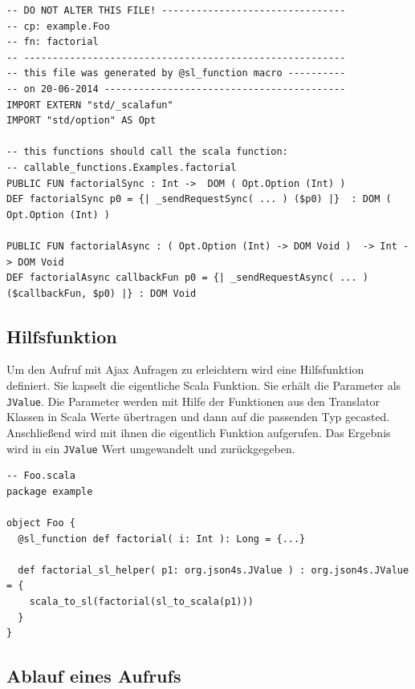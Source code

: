 \documentclass[12pt]{scrreprt}
\begin{document}
\begin{lstlisting}[caption=SL-Modul factorial.sl zur Funktion aus Listing \ref{lst:example-function}, label=lst:example-sl-modul, float=h]
-- DO NOT ALTER THIS FILE! --------------------------------
-- cp: example.Foo
-- fn: factorial
-- --------------------------------------------------------
-- this file was generated by @sl_function macro ----------
-- on 20-06-2014 ------------------------------------------
IMPORT EXTERN "std/_scalafun"
IMPORT "std/option" AS Opt

-- this functions should call the scala function:
-- callable_functions.Examples.factorial
PUBLIC FUN factorialSync : Int ->  DOM ( Opt.Option (Int) )
DEF factorialSync p0 = {| _sendRequestSync( ... ) ($p0) |}  : DOM ( Opt.Option (Int) )

PUBLIC FUN factorialAsync : ( Opt.Option (Int) -> DOM Void )  -> Int -> DOM Void
DEF factorialAsync callbackFun p0 = {| _sendRequestAsync( ... )  ($callbackFun, $p0) |} : DOM Void
\end{lstlisting}

\subsection{Hilfsfunktion}
\label{subsec:helperfunction}

Um den Aufruf mit Ajax Anfragen zu erleichtern wird eine Hilfsfunktion definiert. Sie kapselt die eigentliche Scala Funktion. Sie erhält die Parameter als \lstinline!JValue!. Die Parameter werden mit Hilfe der Funktionen aus den Translator Klassen in Scala Werte übertragen und dann auf die passenden Typ gecasted. Anschließend wird mit ihnen die eigentlich Funktion aufgerufen. Das Ergebnis wird in ein \lstinline!JValue! Wert umgewandelt und zurückgegeben.

\begin{lstlisting}[caption=Hilfsfunktion zur Funktion aus Listing \ref{lst:example-function}, label=lst:helperfunction, float=h]
-- Foo.scala
package example

object Foo {
  @sl_function def factorial( i: Int ): Long = {...}
  
  def factorial_sl_helper( p1: org.json4s.JValue ) : org.json4s.JValue = {
    scala_to_sl(factorial(sl_to_scala(p1)))
  }
}
\end{lstlisting}


\subsection{Ablauf eines Aufrufs}
\label{subs:call-scala-functions}
\end{document}

